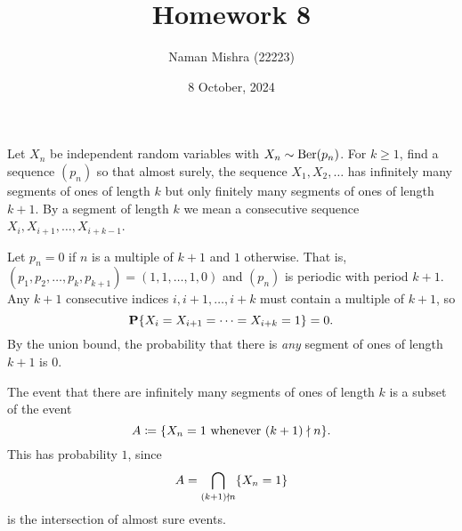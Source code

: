 \documentclass[12pt]{article}
\title{Homework 8}
\author{Naman Mishra (22223)}
\date{8 October, 2024}
\begin{document}
\maketitle

\begin{problem*}
    Let $X_n$ be independent random variables with $X_n \sim \operatorname{Ber}(p_n)$.
    For $k \ge 1$, find a sequence $(p_n)$ so that almost surely, the
    sequence $X_1, X_2, \dots$ has infinitely many segments of ones of
    length $k$ but only finitely many segments of ones of length $k + 1$.
    By a segment of length $k$ we mean a consecutive sequence
    $X_i, X_{i+1}, \dots, X_{i+k-1}$.
\end{problem*}
\begin{solution}
    Let $p_n = 0$ if $n$ is a multiple of $k + 1$ and $1$ otherwise.
    That is, $(p_1, p_2, \dots, p_k, p_{k+1}) = (1, 1, \dots, 1, 0)$
    and $(p_n)$ is periodic with period $k + 1$.
    Any $k+1$ consecutive indices $i, i+1, \dots, i+k$ must contain
    a multiple of $k+1$, so \[
        \operatorname{\mathbf P}\{X_i = X_{i+1} = \dots = X_{i+k} = 1\} = 0.
    \] By the union bound, the probability that there is \emph{any} segment
    of ones of length $k+1$ is $0$.

    The event that there are infinitely many segments of ones of length
    $k$ is a subset of the event \[
        A \coloneq \{X_n = 1 \text{ whenever } (k + 1) \nmid n\}.
    \] This has probability $1$, since \[
        A = \bigcap_{(k + 1) \nmid n} \{X_n = 1\}
    \] is the intersection of almost sure events.\footnotemark
\end{solution}
\end{document}
